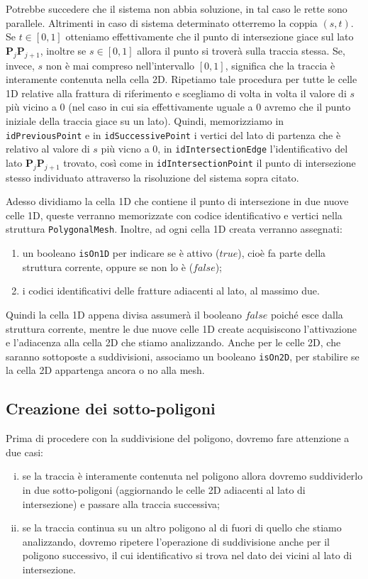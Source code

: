 \documentclass[a4paper]{article}
\newcommand{\B}{\mathbf}
\begin{document}
Potrebbe succedere che il sistema non abbia soluzione, in tal caso le rette sono parallele. Altrimenti in caso di sistema determinato otterremo la coppia $( s,t )$. Se $t \in [0,1]$ otteniamo effettivamente che il punto di intersezione giace sul lato $\B{P}_{j}\B{P}_{j+1}$, inoltre se $s \in [0,1]$ allora il punto si troverà sulla traccia stessa. Se, invece, $s$ non è mai compreso nell'intervallo $[0,1]$, significa che la traccia è interamente contenuta nella cella 2D. Ripetiamo tale procedura per tutte le celle 1D relative alla frattura di riferimento e scegliamo di volta in volta il valore di $s$ più vicino a 0 (nel caso in cui sia effettivamente uguale a $0$ avremo che il punto iniziale della traccia giace su un lato).
Quindi, memorizziamo in \texttt{idPreviousPoint} e in \texttt{idSuccessivePoint} i vertici del lato di partenza che è relativo al valore di $s$ più vicno a $0$, in \texttt{idIntersectionEdge} l'identificativo del lato $\B{P}_{j}\B{P}_{j+1}$ trovato, così come in \texttt{idIntersectionPoint} il punto di intersezione stesso individuato attraverso la risoluzione del sistema sopra citato. 

Adesso dividiamo la cella 1D che contiene il punto di intersezione in due nuove celle 1D, queste verranno memorizzate con codice identificativo e vertici nella struttura \texttt{PolygonalMesh}. Inoltre, ad ogni cella 1D creata verranno assegnati: 
\begin{enumerate} 
\item un booleano \texttt{isOn1D} per indicare se è attivo ($true$), cioè fa parte della struttura corrente, oppure se non lo è ($false$);
\item i codici identificativi delle fratture adiacenti al lato, al massimo due.
\end{enumerate}

Quindi la cella 1D appena divisa assumerà il booleano $false$ poiché esce dalla struttura corrente, mentre le due nuove celle 1D create acquisiscono l'attivazione e l'adiacenza alla cella 2D che stiamo analizzando. Anche per le celle 2D, che saranno sottoposte a suddivisioni, associamo un booleano \texttt{isOn2D}, per stabilire se la cella 2D appartenga ancora o no alla mesh.

\subsection{Creazione dei sotto-poligoni}
Prima di procedere con la suddivisione del poligono, dovremo fare attenzione a due casi: 
\begin{enumerate} [(i)]
\item se la traccia è interamente contenuta nel poligono allora dovremo suddividerlo in due sotto-poligoni (aggiornando le celle 2D adiacenti al lato di intersezione) e passare alla traccia successiva;
\item se la traccia continua su un altro poligono al di fuori di quello che stiamo analizzando, dovremo ripetere l'operazione di suddivisione anche per il poligono successivo, il cui identificativo si trova nel dato dei vicini al lato di intersezione.
\end{enumerate}
\end{document}
